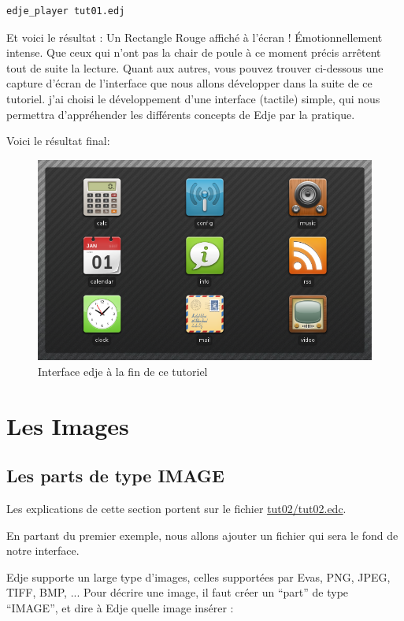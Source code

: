 \documentclass[a4paper]{efr}
\begin{document}
\begin{lstlisting}
edje_player tut01.edj
\end{lstlisting}

Et voici le résultat : Un Rectangle Rouge affiché à l'écran ! Émotionnellement
intense.
Que ceux qui n'ont pas la chair de poule à ce moment précis arrêtent tout de
suite la lecture. Quant aux autres, vous pouvez trouver ci-dessous une capture
d'écran de l'interface que nous allons développer dans la suite de ce tutoriel.
j'ai choisi le développement d'une interface (tactile) simple, qui nous
permettra d'appréhender les différents concepts de Edje par la pratique.

Voici le résultat final:
\begin{figure}
  \begin{center}
    \includegraphics[scale=0.5]{images/screenshot1.png}
  \end{center}
  \caption{Interface edje à la fin de ce tutoriel}
\end{figure}

\section{Les Images}
\subsection{Les parts de type IMAGE}
Les explications de cette section portent sur le fichier
\href{file://tut02/tut02.edc}{tut02/tut02.edc}.

En partant du premier exemple, nous allons ajouter un fichier qui sera le fond
de notre interface.

Edje supporte un large type d'images, celles supportées par Evas,
PNG, JPEG, TIFF, BMP, ...
Pour décrire une image, il faut créer un ``part'' de type ``IMAGE'',
et dire à Edje quelle image insérer :
\end{document}

